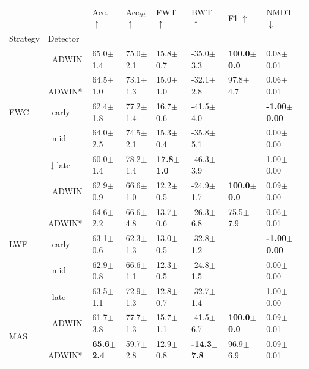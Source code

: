 \begin{tabular}{llllllll}
\toprule
 &  & Acc. $\uparrow$ & Acc$_{ttt}$ $\uparrow$ & FWT $\uparrow$ & BWT $\uparrow$ & F1 $\uparrow$ & NMDT $\downarrow$ \\
Strategy & Detector &  &  &  &  &  &  \\
\midrule
\multirow[t]{5}{*}{EWC} & $\ \;$ADWIN & 65.0\tiny{$\pm$1.4} & 75.0\tiny{$\pm$2.1} & 15.8\tiny{$\pm$0.7} & -35.0\tiny{$\pm$3.3} & \textbf{100.0\tiny{$\pm$0.0}} & 0.08\tiny{$\pm$0.01} \\
 & $\ \;$ADWIN* & 64.5\tiny{$\pm$1.0} & 73.1\tiny{$\pm$1.3} & 15.0\tiny{$\pm$1.0} & -32.1\tiny{$\pm$2.8} & 97.8\tiny{$\pm$4.7} & 0.06\tiny{$\pm$0.01} \\
 & $\ \;$early & 62.4\tiny{$\pm$1.8} & 77.2\tiny{$\pm$1.4} & 16.7\tiny{$\pm$0.6} & -41.5\tiny{$\pm$4.0} &  & \textbf{-1.00\tiny{$\pm$0.00}} \\
 & $\ \;$mid & 64.0\tiny{$\pm$2.5} & 74.5\tiny{$\pm$2.1} & 15.3\tiny{$\pm$0.4} & -35.8\tiny{$\pm$5.1} &  & 0.00\tiny{$\pm$0.00} \\
 & $\downarrow$late & 60.0\tiny{$\pm$1.4} & 78.2\tiny{$\pm$1.4} & \textbf{17.8\tiny{$\pm$1.0}} & -46.3\tiny{$\pm$3.9} &  & 1.00\tiny{$\pm$0.00} \\
\midrule
\multirow[t]{5}{*}{LWF} & $\ \;$ADWIN & 62.9\tiny{$\pm$0.9} & 66.6\tiny{$\pm$1.0} & 12.2\tiny{$\pm$0.5} & -24.9\tiny{$\pm$1.7} & \textbf{100.0\tiny{$\pm$0.0}} & 0.09\tiny{$\pm$0.00} \\
 & $\ \;$ADWIN* & 64.6\tiny{$\pm$2.2} & 66.6\tiny{$\pm$4.8} & 13.7\tiny{$\pm$0.6} & -26.3\tiny{$\pm$6.8} & 75.5\tiny{$\pm$7.9} & 0.06\tiny{$\pm$0.01} \\
 & $\ \;$early & 63.1\tiny{$\pm$0.6} & 62.3\tiny{$\pm$1.3} & 13.0\tiny{$\pm$0.5} & -32.8\tiny{$\pm$1.2} &  & \textbf{-1.00\tiny{$\pm$0.00}} \\
 & $\ \;$mid & 62.9\tiny{$\pm$0.8} & 66.6\tiny{$\pm$1.1} & 12.3\tiny{$\pm$0.5} & -24.8\tiny{$\pm$1.5} &  & 0.00\tiny{$\pm$0.00} \\
 & $\ \;$late & 63.5\tiny{$\pm$1.1} & 72.9\tiny{$\pm$1.3} & 12.8\tiny{$\pm$0.7} & -32.7\tiny{$\pm$1.4} &  & 1.00\tiny{$\pm$0.00} \\
\midrule
\multirow[t]{5}{*}{MAS} & $\ \;$ADWIN & 61.7\tiny{$\pm$3.8} & 77.7\tiny{$\pm$1.3} & 15.7\tiny{$\pm$1.1} & -41.5\tiny{$\pm$6.7} & \textbf{100.0\tiny{$\pm$0.0}} & 0.09\tiny{$\pm$0.01} \\
 & $\ \;$ADWIN* & \textbf{65.6\tiny{$\pm$2.4}} & 59.7\tiny{$\pm$2.8} & 12.9\tiny{$\pm$0.8} & \textbf{-14.3\tiny{$\pm$7.8}} & 96.9\tiny{$\pm$6.9} & 0.09\tiny{$\pm$0.01} \\

\end{tabular}
